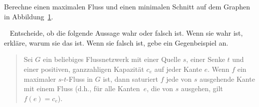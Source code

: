 \documentclass{uebung_cs}
\begin{document}
\newpage

\begin{aufgabe}
    Berechne einen maximalen Fluss und einen minimalen Schnitt auf dem Graphen in Abbildung~\ref{Figure_4}.
    
    \begin{figure}[ht]
	\begin{center}
		\caption{\label{Figure_4}}
	\end{center}
\end{figure}
\end{aufgabe}

\begin{aufgabe}\
    Entscheide, ob die folgende Aussage wahr oder falsch ist. Wenn sie wahr ist, erkläre, warum sie das ist. Wenn sie falsch ist, gebe ein Gegenbeispiel an.
    \begin{quote}
        Sei $G$ ein beliebiges Flussnetzwerk mit einer Quelle $s$, einer Senke $t$ und einer positiven, ganzzahligen Kapazität $c_e$ auf jeder Kante $e$. Wenn $f$ ein maximaler $s$-$t$-Fluss in $G$ ist, dann saturiert $f$ jede von $s$ ausgehende Kante mit einem Fluss (d.h., für alle Kanten~$e$, die von $s$ ausgehen, gilt $f(e) = c_e$).
    \end{quote}
\end{aufgabe}
\end{document}
